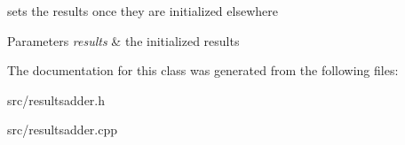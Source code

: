 sets the results once they are initialized elsewhere 


\begin{DoxyParams}{Parameters}
{\em results} & the initialized results \\
\hline
\end{DoxyParams}


The documentation for this class was generated from the following files\+:\begin{DoxyCompactItemize}
\item 
src/resultsadder.\+h\item 
src/resultsadder.\+cpp\end{DoxyCompactItemize}
